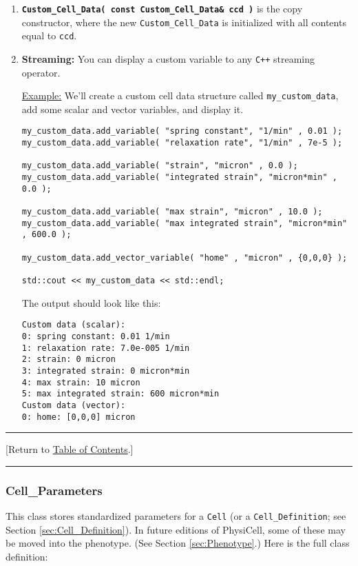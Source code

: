 \documentclass[12pt]{article}
\renewcommand{\v}{\verb}
\newcommand{\smallcode}[1]{\textbf{\texttt{#1}}}
\newcommand{\TOClink}{\begin{center}\hrule\vskip-5pt\phantom{.}\hfill[Return to \hyperlink{TOC}{Table of Contents}.]\hfill\phantom{.}\vskip3pt\hrule\end{center}}
\begin{document}
\begin{enumerate}
\item 
\smallcode{Custom\_Cell\_Data( const Custom\_Cell\_Data\& ccd )} is the 
copy constructor, where the new \v|Custom_Cell_Data| is initialized 
with all contents equal to \v|ccd|. 
 
\item 
\textbf{Streaming:} You can display a custom variable to any 
\v|C++| streaming operator. 

\underline{Example:} We'll create a custom cell data structure called \v|my_custom_data|, 
add some scalar and vector variables, and display it. 
\begin{verbatim}
my_custom_data.add_variable( "spring constant", "1/min" , 0.01 ); 
my_custom_data.add_variable( "relaxation rate", "1/min" , 7e-5 ); 

my_custom_data.add_variable( "strain", "micron" , 0.0 ); 
my_custom_data.add_variable( "integrated strain", "micron*min" , 0.0 ); 

my_custom_data.add_variable( "max strain", "micron" , 10.0 ); 
my_custom_data.add_variable( "max integrated strain", "micron*min" , 600.0 ); 

my_custom_data.add_vector_variable( "home" , "micron" , {0,0,0} ); 

std::cout << my_custom_data << std::endl; 
\end{verbatim}

The output should look like this: 

\begin{verbatim}
Custom data (scalar):
0: spring constant: 0.01 1/min
1: relaxation rate: 7.0e-005 1/min
2: strain: 0 micron
3: integrated strain: 0 micron*min
4: max strain: 10 micron
5: max integrated strain: 600 micron*min
Custom data (vector):
0: home: [0,0,0] micron 
\end{verbatim}

\end{enumerate}

\TOClink 

\subsubsection{Cell\_Parameters}
\label{sec:Cell_Parameters} 
This class stores standardized parameters for a \v|Cell| (or a 
\v|Cell_Definition|; see Section \ref{sec:Cell_Definition}). In 
future editions of PhysiCell, some of these may be moved into the 
phenotype. (See Section \ref{sec:Phenotype}.)  Here 
is the full class definition: 
\end{document}
